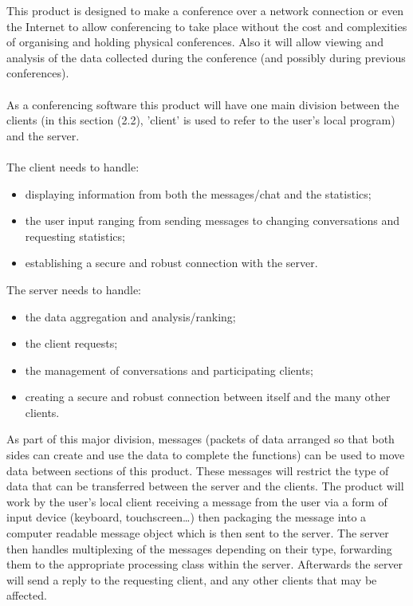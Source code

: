 \documentclass[12p, a4paper, onecolumn]{report}
\begin{document}
This product is designed to make a conference over a network connection or even the Internet to allow conferencing to take place without the cost and complexities of organising and holding physical conferences. Also it will allow viewing and analysis of the data collected during the conference (and possibly during previous conferences). \\ \\
As a conferencing software this product will have one main division between the clients (in this section (2.2), 'client' is used to refer to the user’s local program) and the server. \\ \\
The client needs to handle: 
\begin{itemize}
\item displaying information from both the messages/chat and the statistics;
\item the user input ranging from sending messages to changing conversations and requesting statistics; 
\item establishing a secure and robust connection with the server.
\end{itemize}
The server needs to handle:
\begin{itemize}
\item the data aggregation and analysis/ranking; 
\item the client requests; 
\item the management of conversations and participating clients; 
\item creating a secure and robust connection between itself and the many other clients. 
\end{itemize}
As part of this major division, messages (packets of data arranged so that both sides can create and use the data to complete the functions) can be used to move data between sections of this product. These messages will restrict the type of data that can be transferred between the server and the clients. The product will work by the user’s local client receiving a message from the user via a form of input device (keyboard, touchscreen\dots) then packaging the message into a computer readable message object which is then sent to the server. The server then handles multiplexing of the messages depending on their type, forwarding them to the appropriate processing class within the server. Afterwards the server will send a reply to the requesting client, and any other clients that may be affected. \\ \\
\end{document}
